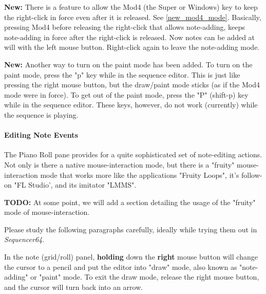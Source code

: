    \textbf{New:}
   There is a feature to allow the Mod4 (the Super or Windows) key to keep the
   right-click in force even after it is released.  See \ref{new_mod4_mode}.
   Basically, pressing Mod4 before releasing the right-click that allows
   note-adding, keeps note-adding in force after the right-click is released.
   Now notes can be added at will with the left mouse button.  Right-click
   again to leave the note-adding mode.

   \textbf{New:}
   Another way to turn on the paint mode has been added.
   To turn on the paint mode, press the
   "p" key while in the sequence editor.
   This is just like pressing the right mouse button, but the draw/paint mode
   sticks (as if the Mod4 mode were in force).
   To get out of the paint mode, press the
   "P" (shift-p) key while in the sequence editor.
   These keys, however, do not work (currently) while the sequence is playing.

\paragraph{Editing Note Events}
\label{paragraph:seq64_pattern_editor_note_events}

   The Piano Roll pane provides for a quite sophisticated set of note-editing
   actions.  Not only is there a native mouse-interaction mode, but there is
   a "fruity" mouse-interaction mode that works more like the applications
   "Fruity Loops", it's follow-on "FL Studio', and its imitator "LMMS".

   \setcounter{ItemCounter}{0}      %

   \textbf{TODO:}
   At some point, we will add a section detailing the usage of the "fruity"
   mode of mouse-interaction.

   Please study the following paragraphs carefully, ideally while
   trying them out in \textsl{Sequencer64}.

	In the note (grid/roll) panel, \textbf{holding}
	down the \textbf{right} mouse button will change the cursor
	to a pencil and put the editor into "draw" mode, also known as
   "note-adding" or "paint" mode.
   To exit the draw mode, release the right mouse button, and the cursor will
   turn back into an arrow.

